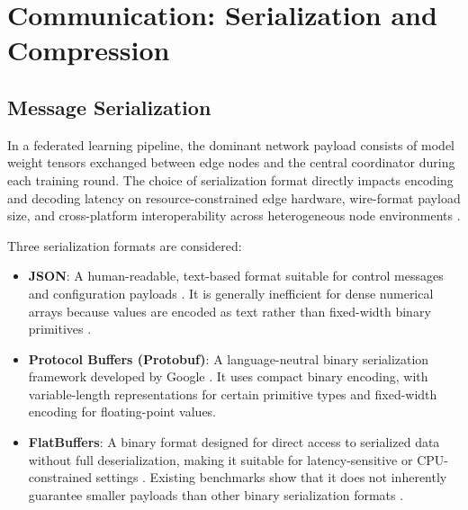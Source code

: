 \chapter{Communication: Serialization and Compression}
\label{ch:communication}

\section{Message Serialization}
\label{sec:serialization}

In a federated learning pipeline, the dominant network payload consists of model weight
tensors exchanged between edge nodes and the central coordinator during each training
round. The choice of serialization format directly impacts encoding and decoding
latency on resource-constrained edge hardware, wire-format payload size, and
cross-platform interoperability across heterogeneous node environments
\cite{mcmahan2017communication}.

Three serialization formats are considered:

\begin{itemize}
   \item \textbf{JSON}: A human-readable, text-based format suitable for control
   messages and configuration payloads \cite{rfc8259}. It is generally inefficient
   for dense numerical arrays because values are encoded as text rather than fixed-width
   binary primitives \cite{ahmad2022arrowflight, gudla2024cbl, blyth2018proio, 
   viotti2022benchmark}.

    \item \textbf{Protocol Buffers (Protobuf)}: A language-neutral binary serialization
    framework developed by Google \cite{protobuf_overview, grpc2016whitepaper}. It uses
    compact binary encoding, with variable-length representations for certain primitive
    types and fixed-width encoding for floating-point values.

   \item \textbf{FlatBuffers}: A binary format designed for direct access to
   serialized data without full deserialization, making it suitable for
   latency-sensitive or CPU-constrained settings \cite{flatbuffers_docs,
   flatbuffers_whitepaper}. Existing benchmarks show that it does not inherently
   guarantee smaller payloads than other binary serialization formats
   \cite{viotti2022benchmark, protobuf_overview}.
\end{itemize}

